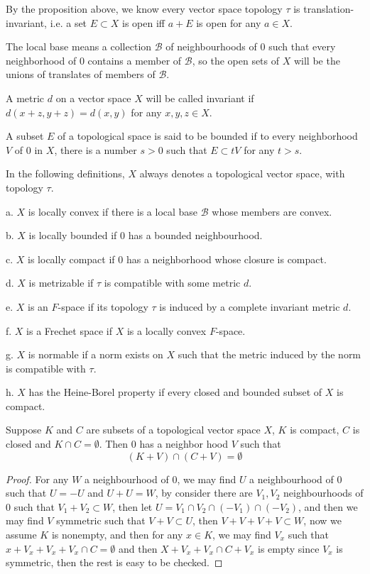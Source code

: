 \documentclass[lang=en, color=blue, ]{elegantbook}
\begin{document}
\begin{definition}
    By the proposition above, we know every vector space topology $\tau$ is translation-invariant, i.e. a set $E\subset X$ is open iff $a+E$ is open for any $a\in X$.\par
    The local base means a collection $\mathscr{B}$ of neighbourhoods of $0$ such that every neighborhood of $0$ contains a member of $\mathscr{B}$, so the open sets of $X$ will be the unions of translates of members of $\mathscr{B}$.\par
    A metric $d$ on a vector space $X$ will be called invariant if $d(x+z,y+z) = d(x,y)$ for any $x,y,z\in X$.\par
    A subset $E$ of a topological space is said to be bounded if to every neighborhood $V$ of $0$ in $X$, there is a number $s>0$ such that $E\subset tV$ for any $t>s$.
\end{definition}

\begin{definition}
    In the following definitions, $X$ always denotes a topological vector space, with topology $\tau$.\par
    a. $X$ is locally convex if there is a local base $\mathscr{B}$ whose members are convex.\par
    b. $X$ is locally bounded if $0$ has a bounded neighbourhood.\par
    c. $X$ is locally compact if $0$ has a neighborhood whose closure is compact.\par
    d. $X$ is metrizable if $\tau$ is compatible with some metric $d$.\par
    e. $X$ is an $F$-space if its topology $\tau$ is induced by a complete invariant metric $d$.\par
    f. $X$ is a Frechet space if $X$ is a locally convex $F$-space.\par
    g. $X$ is normable if a norm exists on $X$ such that the metric induced by the norm is compatible with $\tau$.\par
    h. $X$ has the Heine-Borel property if every closed and bounded subset of $X$ is compact.
\end{definition}

\begin{theorem}
    Suppose $K$ and $C$ are subsets of a topological vector space $X$, $K$ is compact, $C$ is closed and $K\cap C = \emptyset$. Then $0$ has a neighbor hood $V$ such that
    \[
    (K+V)\cap(C+V) = \emptyset
    \]
\end{theorem}
\begin{proof}
    For any $W$ a neighbourhood of $0$, we may find $U$ a neighbourhood of $0$ such that $U=-U$ and $U+U = W$, by consider there are $V_1,V_2$ neighbourhoods of $0$ such that $V_1+V_2 \subset W$, then let $U = V_1\cap V_2 \cap (-V_1)\cap(-V_2)$, and then we may find $V$ symmetric such that $V+V\subset U$, then $V+V+V+V \subset W$, now we assume $K$ is nonempty, and then for any $x\in K$, we may find $V_x$ such that $x+V_x+V_x+V_x \cap C =\emptyset$ and then $X+V_x+V_x\cap C+V_x$ is empty since $V_x$ is symmetric, then the rest is easy to be checked.
\end{proof}
\end{document}
